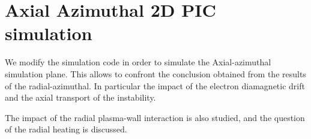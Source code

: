 



\chapter{Axial Azimuthal 2D PIC simulation}
\label{ch-6}


\begin{Chabstract}
  We modify the simulation code \LPPic in order to simulate the Axial-azimuthal simulation plane.
  This allows to confront the conclusion obtained from the results of the radial-azimuthal.
  In particular the impact of the electron diamagnetic drift and the axial transport of the instability.
  
  The impact of the radial plasma-wall interaction is also studied, and the question of the radial heating is discussed. 
\end{Chabstract}
\renewcommand\subfigurewidth{3in}

% 
% 

\minitoc








